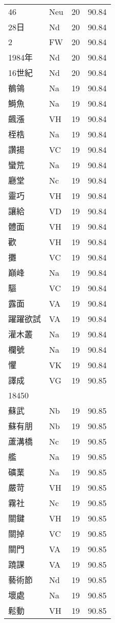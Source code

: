 \documentclass[twocolumn]{book}
\begin{document}
\begin{supertabular}{llrr}
46 & Neu & 20 &  90.84\\
28日 & Nd & 20 &  90.84\\
2 & FW & 20 &  90.84\\
1984年 & Nd & 20 &  90.84\\
16世紀 & Nd & 20 &  90.84\\
鶺鴒 & Na & 19 &  90.84\\
鰣魚 & Na & 19 &  90.84\\
飆漲 & VH & 19 &  90.84\\
桎梏 & Na & 19 &  90.84\\
讚揚 & VC & 19 &  90.84\\
蠻荒 & Na & 19 &  90.84\\
廳堂 & Nc & 19 &  90.84\\
靈巧 & VH & 19 &  90.84\\
讓給 & VD & 19 &  90.84\\
體面 & VH & 19 &  90.84\\
歡 & VH & 19 &  90.84\\
攤 & VC & 19 &  90.84\\
巔峰 & Na & 19 &  90.84\\
驅 & VC & 19 &  90.84\\
露面 & VA & 19 &  90.84\\
躍躍欲試 & VA & 19 &  90.84\\
灌木叢 & Na & 19 &  90.84\\
欄號 & Na & 19 &  90.84\\
懼 & VK & 19 &  90.84\\
譯成 & VG & 19 &  90.85\\
18450\\
蘇武 & Nb & 19 &  90.85\\
蘇有朋 & Nb & 19 &  90.85\\
蘆溝橋 & Nc & 19 &  90.85\\
艦 & Na & 19 &  90.85\\
礦業 & Na & 19 &  90.85\\
嚴苛 & VH & 19 &  90.85\\
霧社 & Nc & 19 &  90.85\\
關鍵 & VH & 19 &  90.85\\
關掉 & VC & 19 &  90.85\\
關門 & VA & 19 &  90.85\\
蹺課 & VA & 19 &  90.85\\
藝術節 & Nd & 19 &  90.85\\
壞處 & Na & 19 &  90.85\\
鬆動 & VH & 19 &  90.85\\

\end{supertabular}
\end{document}
